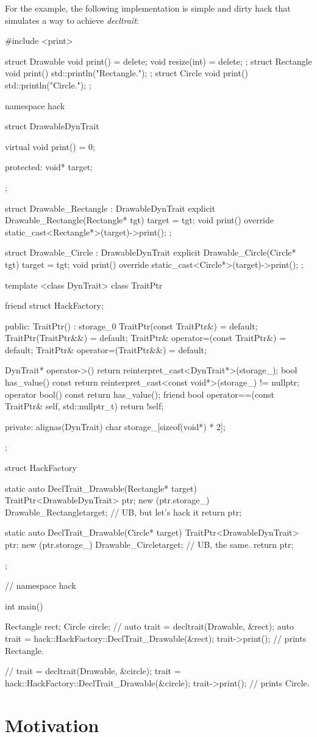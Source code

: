 \documentclass{article}
\begin{document}
For the example, the following implementation is simple and dirty hack that simulates a way to achieve \textit{decltrait}:
\begin{codeblock}
#include <print>

struct Drawable {
  void print() = delete;
  void resize(int) = delete;
};
struct Rectangle {
  void print() { std::println("Rectangle."); }
};
struct Circle {
  void print() { std::println("Circle."); }
};

namespace hack {

struct DrawableDynTrait {
  virtual void print() = 0;

 protected:
  void* target;
};

struct Drawable_Rectangle : DrawableDynTrait {
  explicit Drawable_Rectangle(Rectangle* tgt) { target = tgt; }
  void print() override { static_cast<Rectangle*>(target)->print(); }
};

struct Drawable_Circle : DrawableDynTrait {
  explicit Drawable_Circle(Circle* tgt) { target = tgt; }
  void print() override { static_cast<Circle*>(target)->print(); }
};

template <class DynTrait>
class TraitPtr {
  friend struct HackFactory;

 public:
  TraitPtr() : storage_{0} {}
  TraitPtr(const TraitPtr&) = default;
  TraitPtr(TraitPtr&&) = default;
  TraitPtr& operator=(const TraitPtr&) = default;
  TraitPtr& operator=(TraitPtr&&) = default;

  DynTrait* operator->()
  { return reinterpret_cast<DynTrait*>(storage_); }
  bool has_value() const {
    return reinterpret_cast<const void*>(storage_) != nullptr;
  }
  operator bool() const { return has_value(); }
  friend bool operator==(const TraitPtr& self, std::nullptr_t)
  { return !self; }

 private:
  alignas(DynTrait) char storage_[sizeof(void*) * 2];
};

struct HackFactory {
  static auto DeclTrait_Drawable(Rectangle* target) {
    TraitPtr<DrawableDynTrait> ptr;
    new (ptr.storage_) Drawable_Rectangle{target}; // UB, but let's hack it
    return ptr;
  }

  static auto DeclTrait_Drawable(Circle* target) {
    TraitPtr<DrawableDynTrait> ptr;
    new (ptr.storage_) Drawable_Circle{target}; // UB, the same.
    return ptr;
  }
};

}  // namespace hack

int main() {
  Rectangle rect;
  Circle circle;
  // auto trait = decltrait(Drawable, \&rect);
  auto trait = hack::HackFactory::DeclTrait_Drawable(&rect);
  trait->print();  // prints Rectangle.

  // trait = decltrait(Drawable, \&circle);
  trait = hack::HackFactory::DeclTrait_Drawable(&circle);
  trait->print();  // prints Circle.
}

\end{codeblock}

\section{Motivation}
\end{document}
